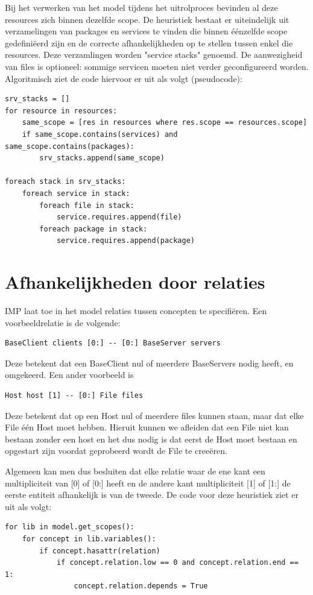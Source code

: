 Bij het verwerken van het model tijdens het uitrolproces bevinden al deze resources zich binnen dezelfde scope.
De heuristiek bestaat er uiteindelijk uit verzamelingen van packages en services te vinden die binnen \'e\'enzelfde scope gedefini\"eerd zijn en de correcte afhankelijkheden op te stellen tussen enkel die resources.
Deze verzamlingen worden "service stacks"  genoemd.
De aanwezigheid van files is optioneel: sommige servicen moeten niet verder geconfigureerd worden.
Algoritmisch ziet de code hiervoor  er uit als volgt (pseudocode):

\begin{lstlisting}
srv_stacks = []
for resource in resources:
    same_scope = [res in resources where res.scope == resources.scope]
    if same_scope.contains(services) and same_scope.contains(packages):
        srv_stacks.append(same_scope)

foreach stack in srv_stacks:
    foreach service in stack:
        foreach file in stack:
            service.requires.append(file)
        foreach package in stack:
            service.requires.append(package)
\end{lstlisting}


\section{Afhankelijkheden door relaties}
\label{relaties}
IMP laat toe in het model relaties tussen concepten te specifi\"eren.
Een voorbeeldrelatie is de volgende:
\begin{lstlisting}
BaseClient clients [0:] -- [0:] BaseServer servers
\end{lstlisting}
Deze betekent dat een BaseClient nul of meerdere BaseServers nodig heeft, en omgekeerd.
Een ander voorbeeld is 
\begin{lstlisting}
Host host [1] -- [0:] File files
\end{lstlisting}
Deze betekent dat op een Host nul of meerdere files kunnen staan, maar dat elke File \'e\'en Host moet hebben.
Hieruit kunnen we afleiden dat een File niet kan bestaan zonder een host en het dus nodig is dat eerst de Host moet bestaan en opgestart zijn voordat geprobeerd wordt de File te cree\"eren.

Algemeen kan men dus besluiten dat elke relatie waar de ene kant een multipliciteit van [0] of [0:] heeft en de andere kant multipliciteit [1] of [1:] de eerste entiteit afhankelijk is van de tweede.
De code voor deze heuristiek ziet er uit als volgt:
\begin{lstlisting}
for lib in model.get_scopes():
    for concept in lib.variables():
        if concept.hasattr(relation)
            if concept.relation.low == 0 and concept.relation.end == 1:
                concept.relation.depends = True
\end{lstlisting}

